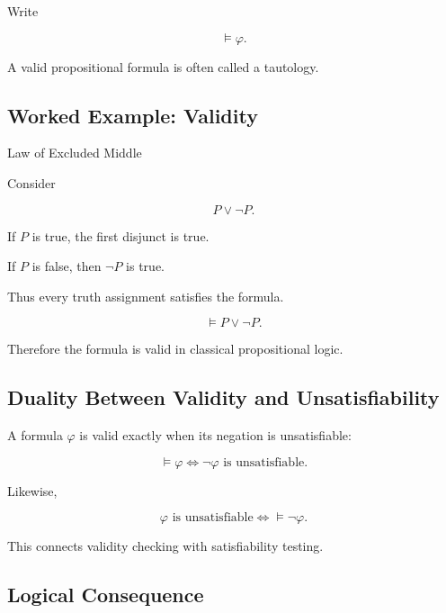 Write

\[
\boxed{
\models\varphi.
}
\]

A valid propositional formula is often called a tautology.

\subsection{Worked Example: Validity}
\label{subsec:worked-validity}

\begin{workedexamplebox}{Law of Excluded Middle}

Consider

\[
P\lor\neg P.
\]

If \(P\) is true, the first disjunct is true.

If \(P\) is false, then \(\neg P\) is true.

Thus every truth assignment satisfies the formula.

\begin{answerbox}
\[
\boxed{
\models
P\lor\neg P.
}
\]
\end{answerbox}

Therefore the formula is valid in classical propositional logic.

\end{workedexamplebox}

\subsection{Duality Between Validity and Unsatisfiability}
\label{subsec:validity-unsatisfiability-duality}

A formula \(\varphi\) is valid exactly when its negation is unsatisfiable:

\[
\boxed{
\models\varphi
\iff
\neg\varphi
\text{ is unsatisfiable}.
}
\]

Likewise,

\[
\boxed{
\varphi
\text{ is unsatisfiable}
\iff
\models\neg\varphi.
}
\]

This connects validity checking with satisfiability testing.

\subsection{Logical Consequence}
\label{subsec:logical-consequence}

